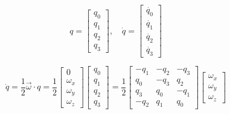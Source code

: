 \begin{equation*}
  q =
  \begin{bmatrix}
  q_0 \\ q_1 \\ q_2 \\ q_3
  \end{bmatrix},
  \quad
  \dot{q} =
  \begin{bmatrix}
  \dot{q_0} \\ \dot{q_1} \\ \dot{q_2} \\ \dot{q_3}
  \end{bmatrix}
\end{equation*}

\qquad

\begin{equation*}
  \dot{q} = \frac{1}{2} \vec{\omega} \cdot q =
  \frac{1}{2}
  \begin{bmatrix}
  0 \\ \omega_x \\ \omega_y \\ \omega_z
  \end{bmatrix}
  \begin{bmatrix}
  q_0 \\ q_1 \\ q_2 \\ q_3
  \end{bmatrix} =
  \frac{1}{2}
  \begin{bmatrix}
  -q_1  & -q_2  & -q_3 \\
   q_0  & -q_3  &  q_2 \\
   q_3  &  q_0  & -q_1 \\
  -q_2  &  q_1  & q_0
  \end{bmatrix}
  \begin{bmatrix}
  \omega_x \\ \omega_y \\ \omega_z
  \end{bmatrix}
\end{equation*}
